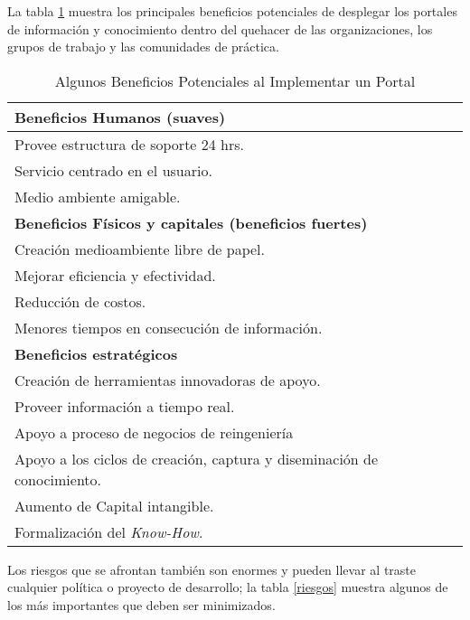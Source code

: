 La tabla \ref{beneficio} muestra los principales beneficios potenciales de desplegar los portales de información y conocimiento dentro del quehacer de las organizaciones, los grupos de trabajo y las comunidades de práctica.

\begin{table}
\begin{center}
\begin{tabular}{|l|}
\hline
\textbf{Beneficios Humanos (suaves)}\\
\hline
Provee estructura de soporte 24 hrs.\\
Servicio centrado en el usuario.\\
Medio ambiente amigable.\\
\hline
\textbf{Beneficios Físicos y capitales (beneficios fuertes)}\\
\hline
Creación medioambiente libre de papel.\\
Mejorar eficiencia y efectividad.\\
Reducción de costos.\\
Menores tiempos en consecución de información.\\
\hline
\textbf{Beneficios estratégicos}\\
\hline
Creación de herramientas innovadoras de apoyo.\\
Proveer información a tiempo real.\\
Apoyo a proceso de negocios de reingeniería\\
Apoyo a los ciclos de creación, captura y diseminación de conocimiento.\\
Aumento de Capital intangible.\\
Formalización del \textit{Know-How}.\\
\hline
\end{tabular}
\caption{Algunos Beneficios Potenciales al Implementar un Portal}
\label{beneficio} 
\end{center}
\end{table}

Los riesgos que se afrontan también son enormes y pueden llevar al traste cualquier política o proyecto de desarrollo; la tabla \ref{riesgos} muestra algunos de los más importantes que deben ser minimizados.

